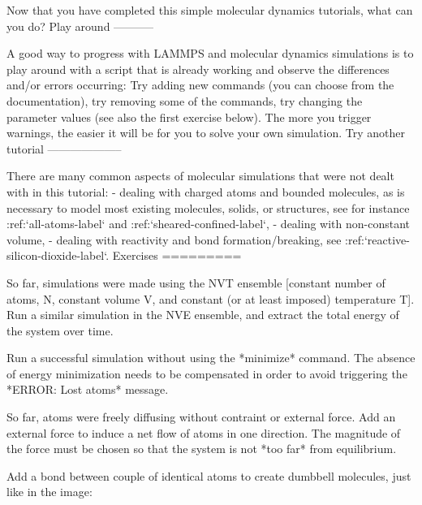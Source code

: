 Now that you have completed this simple molecular dynamics tutorials, what can you do?
Play around
-----------

A good way to progress with LAMMPS and molecular dynamics
simulations is to play around with a script that is already
working and observe the differences and/or errors occurring:
Try adding new commands (you can choose from the documentation),
try removing some of the commands, try changing the parameter values
(see also the first exercise below).
The more you trigger warnings, the easier it will be for you to solve your
own simulation.
Try another tutorial
--------------------

There are many common aspects of molecular simulations that were not dealt with in this
tutorial:
- dealing with charged atoms and bounded molecules, as is necessary to model most existing molecules, solids, or structures, see for instance :ref:`all-atoms-label` and :ref:`sheared-confined-label`,
- dealing with non-constant volume,
- dealing with reactivity and bond formation/breaking, see :ref:`reactive-silicon-dioxide-label`.
Exercises
=========

So far, simulations were made using the NVT ensemble [constant number 
of atoms, N, constant volume V, and constant (or at least imposed)
temperature T].
Run a similar simulation in the NVE ensemble, and extract the
total energy of the system over time.


Run a successful simulation without using the *minimize* command.
The absence of energy minimization needs to be compensated
in order to avoid triggering the *ERROR: Lost atoms* message.


So far, atoms were freely diffusing without contraint or external force.
Add an external force to induce a net flow of atoms in one
direction. The magnitude of the force must be chosen so
that the system is not *too far* from equilibrium.


Add a bond between couple of identical atoms to create
dumbbell molecules, just like in the image:



